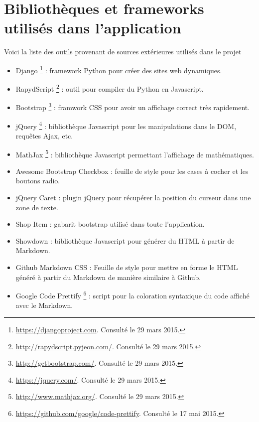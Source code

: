 \documentclass[a4,10pt,french]{sphinxmanual}
\begin{document}
\section{Bibliothèques et frameworks utilisés dans l'application}
\label{global:bibliotheques-et-frameworks-utilises-dans-l-application}
Voici la liste des outils provenant de sources extérieures utilisés dans le projet
\begin{itemize}
\item {} 
Django \footnote{
\href{https://djangoproject.com}{https://djangoproject.com}. Consulté le 29 mars 2015.
} : framework Python pour créer des sites web dynamiques.

\item {} 
RapydScript \footnote{
\href{http://rapydscript.pyjeon.com/}{http://rapydscript.pyjeon.com/}. Consulté le 29 mars 2015.
} : outil pour compiler du Python en Javascript.

\item {} 
Bootstrap \footnote{
\href{http://getbootstrap.com/}{http://getbootstrap.com/}. Consulté le 29 mars 2015.
} : framwork CSS pour avoir un affichage correct très rapidement.

\item {} 
jQuery \footnote{
\href{https://jquery.com/}{https://jquery.com/}. Consulté le 29 mars 2015.
} : bibliothèque Javascript pour les manipulations dans le DOM, requêtes Ajax, etc.

\item {} 
MathJax \footnote{
\href{http://www.mathjax.org/}{http://www.mathjax.org/}. Consulté le 29 mars 2015.
} : bibliothèque Javascript permettant l'affichage de mathématiques.

\item {} 
Awesome Bootstrap Checkbox \footnotemark[12] : feuille de style pour les cases à cocher et les boutons radio.

\item {} 
jQuery Caret \footnotemark[14] : plugin jQuery pour récupérer la position du curseur dans une zone de texte.

\item {} 
Shop Item \footnotemark[13] : gabarit bootstrap utilisé dans toute l'application.

\item {} 
Showdown \footnotemark[20] : bibliothèque Javascript pour générer du HTML à partir de Markdown.

\item {} 
Github Markdown CSS \footnotemark[21] : Feuille de style pour mettre en forme le HTML généré à partir du Markdown de manière similaire à Github.

\item {} 
Google Code Prettify \footnote{
\href{https://github.com/google/code-prettify}{https://github.com/google/code-prettify}. Consulté le 17 mai 2015.
} : script pour la coloration syntaxique du code affiché avec le Markdown.

\end{itemize}
\end{document}
